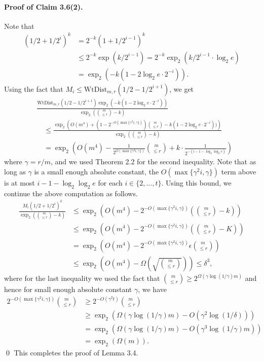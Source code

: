 \paragraph{Proof of Claim 3.6(2).} Note that
\begin{align*}(1/2+1/2^i)^k&=2^{-k}(1+1/2^{i-1})^k\\&\le2^{-k}\exp(k/2^{i-1})=2^{-k}\operatorname{exp}_2(k/2^{i-1}\cdot\log_2e)\\&=\operatorname{exp}_2(-k(1-2\log_2e\cdot2^{-i})).\end{align*}
Using the fact that $M_i\le\mathrm{WtDist}_{m,r}(1/2-1/2^{i+1})$, we get
\begin{align*}&\frac{\mathrm{WtDist}_{m,r}(1/2-1/2^{i+1})\operatorname{exp}_2(-k(1-2\log_2e\cdot2^{-i}))}{\operatorname{exp}_2\left(\binom m{\le r}-k\right)}\\&\quad\le\frac{\operatorname{exp}_2\left(O(m^4)+(1-2^{-O(\max\{\gamma^2i,\gamma\})})\binom m{\le r}-k(1-2\log_2e\cdot2^{-i}))\right)}{\operatorname{exp}_2\left(\binom m{\le r}-k\right)}\\&\quad=\operatorname{exp}_2\left(O(m^4)-\frac1{2^{O(\max\{\gamma^2i,\gamma\})}}\binom m{\le r}+k\cdot\frac1{2^{-(i-1-\log_2\log_2e)}}\right)\end{align*}
where $\gamma=r/m$, and we used Theorem 2.2 for the second inequality.
Note that as long as $\gamma$ is a small enough absolute constant, the $O(\max\{\gamma^2i,\gamma\})$ term above is at most $i-1-\log_2\log_2e$ for each $i\in\{2,\ldots,t\}$. Using this bound, we continue the above computation as follows.
\begin{align*}\frac{M_i(1/2+1/2^i)^k}{\operatorname{exp}_2\left(\binom m{\le r}-k\right)}&\le\operatorname{exp}_2\left(O(m^4)-2^{-O(\max\{\gamma^2i,\gamma\})}\left(\binom m{\le r}-k\right)\right)\\&\le\operatorname{exp}_2\left(O(m^4)-2^{-O(\max\{\gamma^2i,\gamma\})}\left(\binom m{\le r}-K\right)\right)\\&=\operatorname{exp}_2\left(O(m^4)-2^{-O(\max\{\gamma^2i,\gamma\})}\epsilon\binom m{\le r}\right)\\&\le\operatorname{exp}_2\left(O(m^4)-\Omega\left(\sqrt{\binom m{\le r}}\right)\right)\le\delta^3,\end{align*}
where for the last inequality we used the fact that $\binom m{\le r}\ge2^{\Omega(\gamma\log(1/\gamma)m)}$ and hence for small enough absolute constant $\gamma$, we have
\begin{align*}2^{-O(\max\{\gamma^2i,\gamma\})}\binom m{\le r}&\ge2^{-O(\gamma^2t)}\binom m{\le r}\\&\ge\operatorname{exp}_2(\Omega(\gamma\log(1/\gamma)m)-O(\gamma^2\log(1/\delta)))\\&=\operatorname{exp}_2(\Omega(\gamma\log(1/\gamma)m)-O(\gamma^3\log(1/\gamma)m))\\&=\operatorname{exp}_2(\Omega(m)).\end{align*}\qed
This completes the proof of Lemma 3.4.
